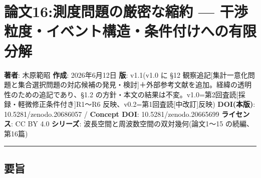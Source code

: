 \documentclass[
]{ltjsarticle}
\author{}
\date{}
\begin{document}
\section{論文16:測度問題の厳密な縮約 ---
干渉粒度・イベント構造・条件付けへの有限分解}\label{ux8ad6ux658716ux6e2cux5ea6ux554fux984cux306eux53b3ux5bc6ux306aux7e2eux7d04-ux5e72ux6e09ux7c92ux5ea6ux30a4ux30d9ux30f3ux30c8ux69cbux9020ux6761ux4ef6ux4ed8ux3051ux3078ux306eux6709ux9650ux5206ux89e3}

\textbf{著者}: 木原範昭 \textbf{作成}: 2026年6月12日 \textbf{版}:
v1.1(v1.0 に §12
観察追記{[}集計一意化問題と集合選択問題の対応候補の発見・検討{]}＋外部参考文献を追加。経緯の透明性のための追記であり、§1.2
の方針・本文の結果は不変。v1.0=第2回査読{[}採録・軽微修正条件付き{]}R1〜R6
反映、v0.2=第1回査読{[}中改訂{]}反映) \textbf{DOI(本版)}:
10.5281/zenodo.20686057 / \textbf{Concept DOI}: 10.5281/zenodo.20665699
\textbf{ライセンス}: CC BY 4.0 \textbf{シリーズ}:
波長空間と周波数空間の双対幾何(論文1〜15 の続編、第16篇)

\begin{center}\rule{0.5\linewidth}{0.5pt}\end{center}

\subsection{要旨}\label{ux8981ux65e8}
\end{document}
